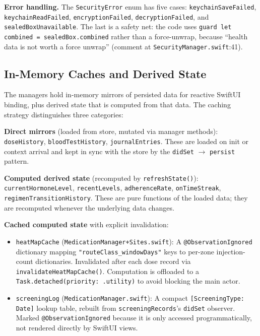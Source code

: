 \documentclass[11pt,a4paper]{article}
\newcommand{\code}[1]{\texttt{\small #1}}
\begin{document}
\textbf{Error handling.} The \code{SecurityError} enum has five cases:
\code{keychainSaveFailed}, \code{keychainReadFailed},
\code{encryptionFailed}, \code{decryptionFailed}, and
\code{sealedBoxUnavailable}. The last is a safety net: the code uses
\code{guard let combined = sealedBox.combined} rather than a force-unwrap,
because ``health data is not worth a force unwrap'' (comment at
\code{SecurityManager.swift}:41).

\subsection{In-Memory Caches and Derived State}
\label{sec:in_memory}

The managers hold in-memory mirrors of persisted data for reactive SwiftUI
binding, plus derived state that is computed from that data. The caching
strategy distinguishes three categories:

\textbf{Direct mirrors} (loaded from store, mutated via manager methods):
\code{doseHistory}, \code{bloodTestHistory}, \code{journalEntries}. These
are loaded on init or context arrival and kept in sync with the store by
the \code{didSet} $\to$ \code{persist} pattern.

\textbf{Computed derived state} (recomputed by \code{refreshState()}):
\code{currentHormoneLevel}, \code{recentLevels}, \code{adherenceRate},
\code{onTimeStreak}, \code{regimenTransitionHistory}. These are pure functions
of the loaded data; they are recomputed whenever the underlying data changes.

\textbf{Cached computed state} with explicit invalidation:

\begin{itemize}[nosep,leftmargin=1.4em]
\item \code{heatMapCache} (\code{MedicationManager+Sites.swift}): A
  \code{@ObservationIgnored} dictionary mapping
  \code{"routeClass\_windowDays"} keys to per-zone injection-count
  dictionaries. Invalidated after each dose record via
  \code{invalidateHeatMapCache()}. Computation is offloaded to a
  \code{Task.detached(priority: .utility)} to avoid blocking the main actor.
\item \code{screeningLog} (\code{MedicationManager.swift}): A compact
  \code{[ScreeningType: Date]} lookup table, rebuilt from
  \code{screeningRecords}'s \code{didSet} observer. Marked
  \code{@ObservationIgnored} because it is only accessed programmatically,
  not rendered directly by SwiftUI views.
\end{itemize}
\end{document}
